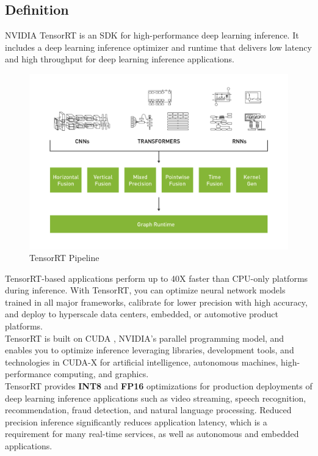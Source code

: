     \subsection{Definition}
        NVIDIA \textregistered TensorRT \texttrademark is an SDK for high-performance deep learning inference. It includes a deep learning inference optimizer and runtime that delivers 
        low latency and high throughput for deep learning inference applications.
        \begin{figure}[H]
            \centering
            \includegraphics[width=0.6\linewidth]{img/tensorRt.png}
            \caption{TensorRT Pipeline}
        \end{figure}
        TensorRT-based applications perform up to 40X faster than CPU-only platforms during inference. With TensorRT, you can optimize neural network models trained in all major frameworks, 
        calibrate for lower precision with high accuracy, and deploy to hyperscale data centers, embedded, or automotive product platforms. \\ 
        \vspace{3mm}
        TensorRT is built on CUDA \textregistered, NVIDIA’s parallel programming model, and enables you to optimize inference leveraging libraries, development tools, and technologies in CUDA-X
        \texttrademark for artificial intelligence, autonomous machines, high-performance computing, and graphics. \\ 
        \vspace{3mm}
        TensorRT provides \textbf{INT8} and \textbf{FP16} optimizations for production deployments of deep learning inference applications such as video streaming, speech recognition, 
        recommendation, fraud detection, and natural language processing. Reduced precision inference significantly reduces application latency, which is a requirement for many real-time services, 
        as well as autonomous and embedded applications. \\ 
        \vspace{3mm}
